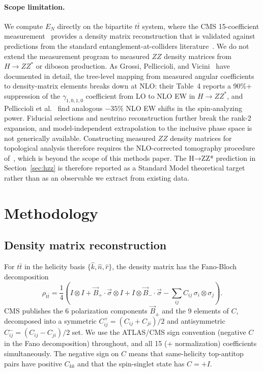 \documentclass[11pt,a4paper]{article}
\theoremstyle{definition}
\begin{document}
\paragraph{Scope limitation.} We compute $E_N$ directly on the bipartite $t\bar{t}$ system, where the CMS 15-coefficient measurement~\cite{CMS2024} provides a density matrix reconstruction that is validated against predictions from the standard entanglement-at-colliders literature~\cite{Afik2021, ATLAS2024}. We do not extend the measurement program to measured $ZZ$ density matrices from $H \to ZZ^*$ or diboson production. As Grossi, Pelliccioli, and Vicini~\cite{GPV2024} have documented in detail, the tree-level mapping from measured angular coefficients to density-matrix elements breaks down at NLO: their Table~4 reports a 90\%+ suppression of the $\gamma_{1,0,1,0}$ coefficient from LO to NLO EW in $H \to ZZ^*$, and Pelliccioli et al.~\cite{Pelliccioli2025NLO} find analogous $-35\%$ NLO EW shifts in the spin-analyzing power. Fiducial selections and neutrino reconstruction further break the rank-2 expansion, and model-independent extrapolation to the inclusive phase space is not generically available. Constructing measured $ZZ$ density matrices for topological analysis therefore requires the NLO-corrected tomography procedure of~\cite{Pelliccioli2025NLO}, which is beyond the scope of this methods paper. The H→ZZ* prediction in Section~\ref{sec:hzz} is therefore reported as a Standard Model theoretical target rather than as an observable we extract from existing data.

\section{Methodology}\label{sec:methodology}

\subsection{Density matrix reconstruction}

For $t\bar{t}$ in the helicity basis $\{\hat{k}, \hat{n}, \hat{r}\}$, the density matrix has the Fano-Bloch decomposition
\begin{equation}
\rho_{t\bar{t}} = \frac{1}{4}\!\left(I \otimes I + \vec{B}_+ \cdot \vec{\sigma} \otimes I + I \otimes \vec{B}_- \cdot \vec{\sigma} - \sum_{ij} C_{ij}\, \sigma_i \otimes \sigma_j\right). \label{eq:fano}
\end{equation}
CMS publishes the 6 polarization components $\vec{B}_\pm$ and the 9 elements of $C$, decomposed into a symmetric $C_{ij}^+ = (C_{ij} + C_{ji})/2$ and antisymmetric $C_{ij}^- = (C_{ij} - C_{ji})/2$ set. We use the ATLAS/CMS sign convention (negative $C$ in the Fano decomposition) throughout, and all 15 (+ normalization) coefficients simultaneously. The negative sign on $C$ means that same-helicity top-antitop pairs have positive $C_{kk}$ and that the spin-singlet state has $C = +I$.
\end{document}
